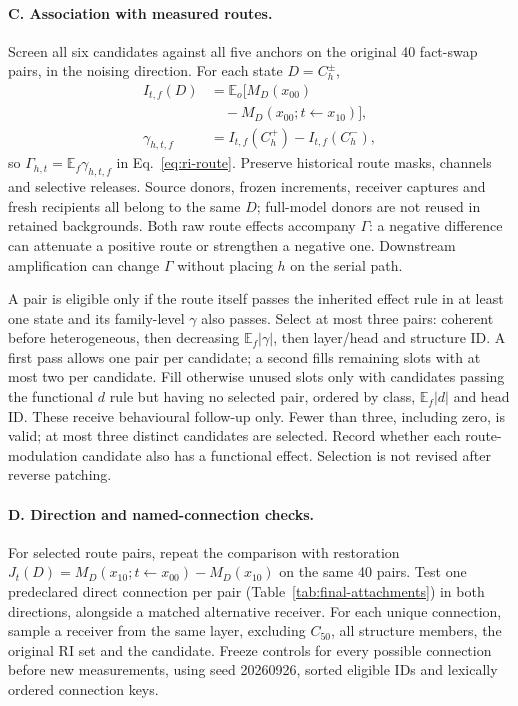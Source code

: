 \paragraph{C. Association with measured routes.}
Screen all six candidates against all five anchors on the original 40 fact-swap
pairs, in the noising direction. For each state $D=C_h^\pm$,
\begin{align*}
I_{t,f}(D)&=\mathbb{E}_o\bigl[M_D(x_{00})\\
 &\quad{}-M_D(x_{00};t\leftarrow x_{10})\bigr],\\
\gamma_{h,t,f}&=I_{t,f}(C_h^+)-I_{t,f}(C_h^-),
\end{align*}
so $\Gamma_{h,t}=\mathbb{E}_f\gamma_{h,t,f}$ in
Eq.~\ref{eq:ri-route}. Preserve historical route masks, channels and selective
releases. Source donors, frozen increments, receiver captures and fresh recipients
all belong to the same $D$; full-model donors are not reused in retained
backgrounds. Both raw route effects accompany $\Gamma$: a negative difference can
attenuate a positive route or strengthen a negative one. Downstream amplification
can change $\Gamma$ without placing $h$ on the serial path.

A pair is eligible only if the route itself passes the inherited effect rule in
at least one state and its family-level $\gamma$ also passes. Select at most
three pairs: coherent before heterogeneous, then decreasing
$\mathbb{E}_f|\gamma|$, then layer/head and structure ID. A first pass allows
one pair per candidate; a second fills remaining slots with at most two per
candidate. Fill otherwise unused slots only with candidates passing the
functional $d$ rule but having no selected pair, ordered by class,
$\mathbb{E}_f|d|$ and head ID. These receive behavioural follow-up only. Fewer
than three, including zero, is valid; at most three distinct candidates are
selected. Record whether each route-modulation candidate also has a functional
effect. Selection is not revised after reverse patching.

\paragraph{D. Direction and named-connection checks.}
For selected route pairs, repeat the comparison with restoration
$J_t(D)=M_D(x_{10};t\leftarrow x_{00})-M_D(x_{10})$ on the same 40 pairs.
Test one predeclared direct connection per pair
(Table~\ref{tab:final-attachments}) in both directions, alongside a matched
alternative receiver. For each unique connection, sample a receiver from the
same layer, excluding $C_{50}$, all structure members, the original RI set and
the candidate. Freeze controls for every possible connection before new
measurements, using seed 20260926, sorted eligible IDs and lexically ordered
connection keys.

